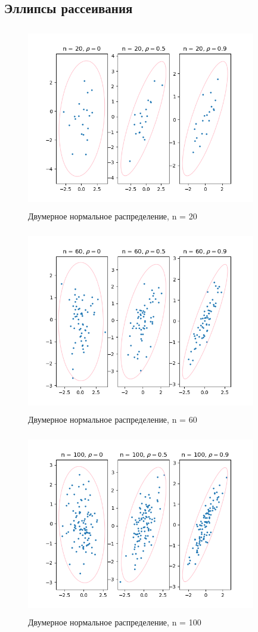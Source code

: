\subsection{Эллипсы рассеивания}
	
	\begin{figure}[H]
		\centering
		\includegraphics[width = 10cm, height = 8cm]{pics/n20.png}
		\caption{Двумерное нормальное распределение, n = 20}
		\label{fig:n20}
	\end{figure}
	
	\begin{figure}[H]
		\centering
		\includegraphics[width = 10cm, height = 8cm]{pics/n60.png}
		\caption{Двумерное нормальное распределение, n = 60}
		\label{fig:n60}
	\end{figure}

	\begin{figure}[H]
		\centering
		\includegraphics[width = 10cm, height = 8cm]{pics/n100.png}
		\caption{Двумерное нормальное распределение, n = 100}
		\label{fig:n100}
	\end{figure}

	
